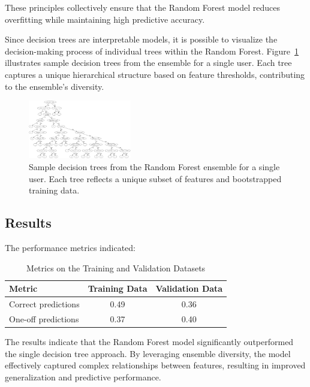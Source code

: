 \documentclass[a4paper,9pt]{article}
\begin{document}
These principles collectively ensure that the Random Forest model reduces overfitting while maintaining high predictive accuracy.

Since decision trees are interpretable models, it is possible to visualize the decision-making process of individual trees within the Random Forest. Figure~\ref{fig:random_forest_trees} illustrates sample decision trees from the ensemble for a single user. Each tree captures a unique hierarchical structure based on feature thresholds, contributing to the ensemble's diversity.

\begin{figure}[h!]
	\centering
	\includegraphics[width=0.4\textwidth]{tree} %
	\caption{Sample decision trees from the Random Forest ensemble for a single user. Each tree reflects a unique subset of features and bootstrapped training data.}
	\label{fig:random_forest_trees}
\end{figure}

\subsection{Results}
The performance metrics indicated:

\begin{table}[ht]
	\centering
	\begin{tabular}{|l|c|c|}
		\hline
		\textbf{Metric}     & \textbf{Training Data} & \textbf{Validation Data} \\ \hline
		Correct predictions & 0.49                   & 0.36                     \\ \hline
		One-off predictions & 0.37                   & 0.40                     \\ \hline
	\end{tabular}
	\caption{Metrics on the Training and Validation Datasets}
	\label{tab:random_forest_results}
\end{table}

The results indicate that the Random Forest model significantly outperformed the
single decision tree approach.
By leveraging ensemble diversity, the model effectively captured complex relationships
between features, resulting in improved generalization and predictive performance.
\end{document}
